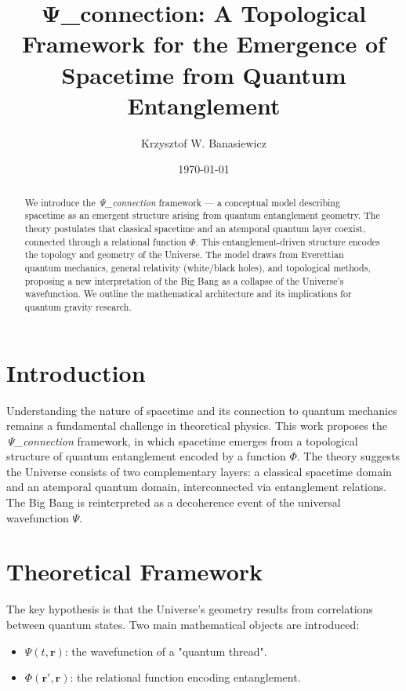 \documentclass[aps,prd,twocolumn,nofootinbib,superscriptaddress]{revtex4-2}
\begin{document}
\title{Ψ\_connection: A Topological Framework for the Emergence of Spacetime from Quantum Entanglement}
\author{Krzysztof W. Banasiewicz}
\date{\today}

\begin{abstract}
We introduce the \textit{Ψ\_connection} framework --- a conceptual model describing spacetime as an emergent structure arising from quantum entanglement geometry. The theory postulates that classical spacetime and an atemporal quantum layer coexist, connected through a relational function $\Phi$. This entanglement-driven structure encodes the topology and geometry of the Universe. The model draws from Everettian quantum mechanics, general relativity (white/black holes), and topological methods, proposing a new interpretation of the Big Bang as a collapse of the Universe’s wavefunction. We outline the mathematical architecture and its implications for quantum gravity research.
\end{abstract}

\maketitle

\section{Introduction}
Understanding the nature of spacetime and its connection to quantum mechanics remains a fundamental challenge in theoretical physics. This work proposes the \textit{Ψ\_connection} framework, in which spacetime emerges from a topological structure of quantum entanglement encoded by a function $\Phi$. The theory suggests the Universe consists of two complementary layers: a classical spacetime domain and an atemporal quantum domain, interconnected via entanglement relations. The Big Bang is reinterpreted as a decoherence event of the universal wavefunction $\Psi$.

\section{Theoretical Framework}
The key hypothesis is that the Universe's geometry results from correlations between quantum states. Two main mathematical objects are introduced:
\begin{itemize}
    \item $\Psi(t, \mathbf{r})$: the wavefunction of a "quantum thread".
    \item $\Phi(\mathbf{r}', \mathbf{r})$: the relational function encoding entanglement.
\end{itemize}
\end{document}
